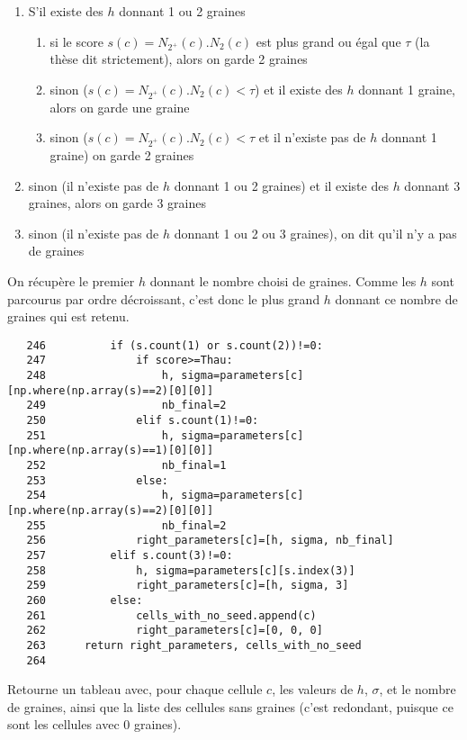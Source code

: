 \documentclass{article}
\def \mycolor {red}
\begin{document}
\begin{enumerate}
\itemsep -1ex
\item S'il existe des $h$ donnant 1 ou 2 graines
\begin{enumerate}
\itemsep -0.5ex
\item si le score $s(c) = N_{2^{+}}(c) . N_2(c)$ est plus grand ou \'egal que $\tau$ (la th\`ese dit strictement), alors on garde 2 graines
\item sinon ($s(c) = N_{2^{+}}(c) . N_2(c) <\tau$) et il existe des $h$ donnant 1 graine, alors on garde une graine
\item sinon ($s(c) = N_{2^{+}}(c) . N_2(c) <\tau$ et il n'existe pas de $h$ donnant 1 graine) on garde 2 graines
\end{enumerate}
\item sinon (il n'existe pas de $h$ donnant 1 ou 2 graines) et il existe des $h$ donnant 3 graines, alors on garde 3 graines
\item sinon  (il n'existe pas de $h$ donnant 1 ou 2 ou 3 graines), on dit qu'il n'y a pas de graines
\end{enumerate}
On r\'ecup\`ere le premier $h$ donnant le nombre choisi de graines. Comme les $h$ sont parcourus par ordre d\'ecroissant, c'est donc le plus grand $h$ donnant ce nombre de graines qui est retenu.
\color{black}
\begin{verbatim}
   246	        if (s.count(1) or s.count(2))!=0:
   247	            if score>=Thau:
   248	                h, sigma=parameters[c][np.where(np.array(s)==2)[0][0]]
   249	                nb_final=2
   250	            elif s.count(1)!=0:
   251	                h, sigma=parameters[c][np.where(np.array(s)==1)[0][0]]
   252	                nb_final=1
   253	            else:
   254	                h, sigma=parameters[c][np.where(np.array(s)==2)[0][0]]
   255	                nb_final=2
   256	            right_parameters[c]=[h, sigma, nb_final]
   257	        elif s.count(3)!=0:
   258	            h, sigma=parameters[c][s.index(3)]
   259	            right_parameters[c]=[h, sigma, 3]
   260	        else:
   261	            cells_with_no_seed.append(c)
   262	            right_parameters[c]=[0, 0, 0]
   263	    return right_parameters, cells_with_no_seed
   264	
\end{verbatim}
\color{\mycolor}
Retourne un tableau avec, pour chaque cellule $c$, les valeurs de $h$, $\sigma$, et le nombre de graines, ainsi que la liste des cellules sans graines (c'est redondant, puisque ce sont les cellules avec 0 graines).
\color{black}
\end{document}
